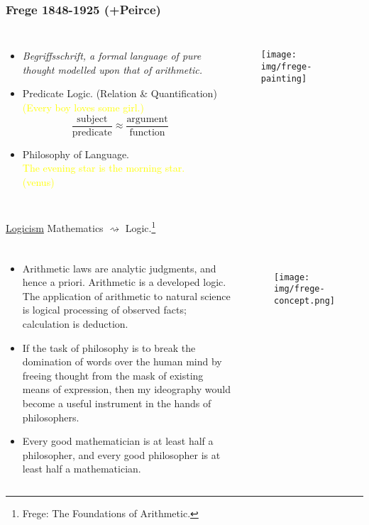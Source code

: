 \documentclass[UTF8,aspectratio=43,11pt,colorlinks,compress,openany]{beamer}%
\begin{document}
\begin{frame}\frametitle{Frege 1848-1925 (+Peirce)}
	\begin{columns}
			\begin{itemize}
				\item \emph{Begriffsschrift, a formal language of pure thought modelled upon that of arithmetic.}
				\item Predicate Logic. (Relation \& Quantification)\\
				\textcolor{yellow}{(Every boy loves some girl.)}
				\[\dfrac{\text{subject}}{\text{predicate}} \approx \dfrac{\text{argument}}{\text{function}}\]
				\item Philosophy of Language.\\
				\textcolor{yellow}{The evening star is the morning star. (venus)}
			\end{itemize}
			\begin{figure}
				\texttt{[image: img/frege-painting]}
			\end{figure}
	\end{columns}
	\centerline{\colorbox{green!30}{\underline{Logicism}} Mathematics $\rightsquigarrow$ Logic.\footnote{\tiny Frege: The Foundations of Arithmetic.}}
\end{frame}

\begin{frame}\frametitle{}
\begin{columns}
\begin{block}{}
	\begin{itemize}
		\item Arithmetic laws are analytic judgments, and hence a priori. Arithmetic is a developed logic. The application of arithmetic to natural science is logical processing of observed facts; calculation is deduction.
		\item If the task of philosophy is to break the domination of words over the human mind by freeing thought from the mask of existing means of expression, then my ideography would become a useful instrument in the hands of philosophers.
		\item Every good mathematician is at least half a philosopher, and every good philosopher is at least half a mathematician.
	\end{itemize}
\end{block}
\begin{figure}[H]
\texttt{[image: img/frege-concept.png]}
\end{figure}
\end{columns}
\end{frame}
\end{document}
